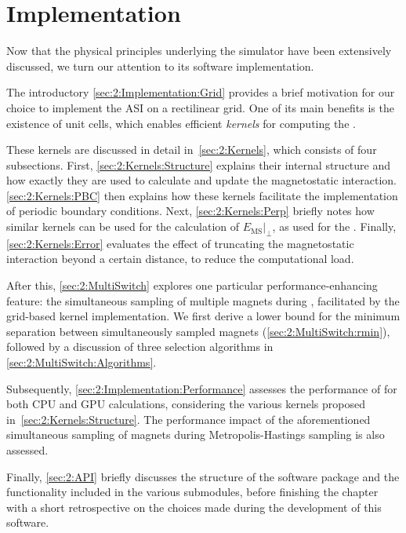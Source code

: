 \section{Implementation}\label{sec:2:Implementation}
Now that the physical principles underlying the simulator have been extensively discussed, we turn our attention to its software implementation. \par
The introductory \cref{sec:2:Implementation:Grid} provides a brief motivation for our choice to implement the ASI on a rectilinear grid.
One of its main benefits is the existence of unit cells, which enables efficient \textit{kernels} for computing the . \par
These kernels are discussed in detail in~\cref{sec:2:Kernels}, which consists of four subsections.
First, \cref{sec:2:Kernels:Structure} explains their internal structure and how exactly they are used to calculate and update the magnetostatic interaction.
\cref{sec:2:Kernels:PBC} then explains how these kernels facilitate the implementation of periodic boundary conditions.
Next, \cref{sec:2:Kernels:Perp} briefly notes how similar kernels can be used for the calculation of $\left. E_{\mathrm{MS}} \right|_{\perp}$, as used for the .
Finally, \cref{sec:2:Kernels:Error} evaluates the effect of truncating the magnetostatic interaction beyond a certain distance, to reduce the computational load. \par
After this, \cref{sec:2:MultiSwitch} explores one particular performance-enhancing feature: the simultaneous sampling of multiple magnets during , facilitated by the grid-based kernel implementation.
We first derive a lower bound for the minimum separation between simultaneously sampled magnets (\cref{sec:2:MultiSwitch:rmin}), followed by a discussion of three selection algorithms in \cref{sec:2:MultiSwitch:Algorithms}. \par
Subsequently, \cref{sec:2:Implementation:Performance} assesses the performance of \hotspice for both CPU and GPU calculations, considering the various kernels proposed in~\cref{sec:2:Kernels:Structure}.
The performance impact of the aforementioned simultaneous sampling of magnets during Metropolis-Hastings sampling is also assessed. \par
Finally, \cref{sec:2:API} briefly discusses the structure of the software package and the functionality included in the various submodules, before finishing the chapter with a short retrospective on the choices made during the development of this software.

